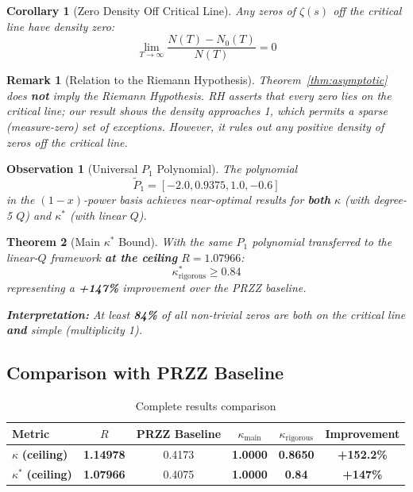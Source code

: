 \documentclass[11pt]{article}
\newtheorem{theorem}{Theorem}
\newtheorem{corollary}{Corollary}
\newtheorem{remark}{Remark}
\newtheorem{observation}[theorem]{Observation}
\begin{document}
\begin{corollary}[Zero Density Off Critical Line]
\label{cor:zero-density}
Any zeros of $\zeta(s)$ off the critical line have density zero:
\[
\lim_{T \to \infty} \frac{N(T) - N_0(T)}{N(T)} = 0
\]
\end{corollary}

\begin{remark}[Relation to the Riemann Hypothesis]
\label{rem:not-rh}
Theorem~\ref{thm:asymptotic} does \textbf{not} imply the Riemann Hypothesis.
RH asserts that \emph{every} zero lies on the critical line; our result shows
the \emph{density} approaches 1, which permits a sparse (measure-zero) set of
exceptions. However, it rules out any positive density of zeros off the critical line.
\end{remark}

\begin{observation}[Universal $P_1$ Polynomial]
\label{obs:universal-P1}
The polynomial
\begin{equation}
\tilde{P}_1 = [-2.0, 0.9375, 1.0, -0.6]
\end{equation}
in the $(1-x)$-power basis achieves near-optimal results for \textbf{both} $\kappa$ (with degree-5 $Q$) and $\kappa^*$ (with linear $Q$).
\end{observation}

\begin{theorem}[Main $\kappa^*$ Bound]
With the same $P_1$ polynomial transferred to the linear-$Q$ framework \textbf{at the ceiling} $R = 1.07966$:
\begin{equation}
\boxed{\kappa^*_{\text{rigorous}} \geq 0.84}
\end{equation}
representing a \textcolor{improvement}{\textbf{+147\%}} improvement over the PRZZ baseline.

\textbf{Interpretation:} At least \textbf{84\%} of all non-trivial zeros are both on the critical line \textbf{and} simple (multiplicity 1).
\end{theorem}

\subsection{Comparison with PRZZ Baseline}

\begin{table}[h]
\centering
\caption{Complete results comparison}
\begin{tabular}{lccccc}
\toprule
Metric & $R$ & PRZZ Baseline & $\kappa_{\text{main}}$ & $\kappa_{\text{rigorous}}$ & Improvement \\
\midrule
\rowcolor{yellow!30} $\kappa$ \textbf{(ceiling)} & \textbf{1.14978} & 0.4173 & \textbf{1.0000} & \textbf{0.8650} & \textcolor{improvement}{\textbf{+152.2\%}} \\
\rowcolor{yellow!30} $\kappa^*$ \textbf{(ceiling)} & \textbf{1.07966} & 0.4075 & \textbf{1.0000} & \textbf{0.84} & \textcolor{improvement}{\textbf{+147\%}} \\
\bottomrule
\end{tabular}
\end{table}
\end{document}
